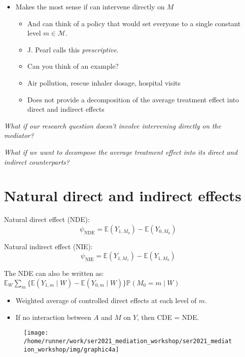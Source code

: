 \documentclass[
  12pt, krantz2,
]{book}
\providecommand{\tightlist}{%
  \setlength{\itemsep}{0pt}\setlength{\parskip}{0pt}}
\theoremstyle{definition}
\theoremstyle{definition}
\theoremstyle{definition}
\renewcommand{\P}{\mathbb{P}}
\newcommand{\E}{\mathbb{E}}
\newcommand{\1}{\mathbbm{1}}
\begin{document}
\begin{itemize}
\tightlist
\item
  Makes the most sense if can intervene directly on \(M\)

  \begin{itemize}
  \tightlist
  \item
    And can think of a policy that would set everyone to a single constant
    level \(m \in \mathcal{M}\).
  \item
    J. Pearl calls this \emph{prescriptive}.
  \item
    Can you think of an example?
  \item
    Air pollution, rescue inhaler dosage, hospital visits
  \item
    Does not provide a decomposition of the average treatment effect into direct and indirect effects
  \end{itemize}
\end{itemize}

\emph{What if our research question doesn't involve intervening directly on the
mediator?}

\emph{What if we want to decompose the average treatment effect into its direct and indirect counterparts?}

\hypertarget{natural-direct-and-indirect-effects}{%
\section*{Natural direct and indirect effects}\label{natural-direct-and-indirect-effects}}


Natural direct effect (NDE):
\[  \psi_{\text{NDE}} = \E(Y_{1,M_0}) - \E(Y_{0,M_0}) \]

Natural indirect effect (NIE):
\[
  \psi_{\text{NIE}} = \E(Y_{1,M_1}) - \E(Y_{1,M_0})
\]

The NDE can also be written as: \(\E_W \sum_m \{\E(Y_{1,m} \mid W) - \E(Y_{0,m} \mid W)\} \P(M_{0}=m \mid W)\)

\begin{itemize}
\tightlist
\item
  Weighted average of controlled direct effects at each level of \(m\).
\item
  If no interaction between \(A\) and \(M\) on \(Y\), then CDE = NDE.
\end{itemize}

\begin{figure}

{\centering \texttt{[image: /home/runner/work/ser2021\_mediation\_workshop/ser2021\_mediation\_workshop/img/graphic4a]} 

}

\end{figure}
\end{document}
